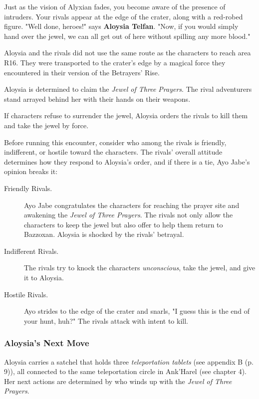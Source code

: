 \documentclass[letterpaper, 11pt, bg=full, twocolumn]{dndbook}
\begin{document}
\begin{DndReadAloud}
Just as the vision of Alyxian fades, you become aware of the presence of intruders. Your rivals appear at the edge of the crater, along with a red-robed figure. "Well done, heroes!" says \textbf{Aloysia Telfan}. "Now, if you would simply hand over the jewel, we can all get out of here without spilling any more blood."
\end{DndReadAloud}

Aloysia and the rivals did not use the same route as the characters to reach area R16. They were transported to the crater's edge by a magical force they encountered in their version of the Betrayers' Rise.

Aloysia is determined to claim the \textit{Jewel of Three Prayers}. The rival adventurers stand arrayed behind her with their hands on their weapons.

If characters refuse to surrender the jewel, Aloysia orders the rivals to kill them and take the jewel by force.

Before running this encounter, consider who among the rivals is friendly, indifferent, or hostile toward the characters. The rivals' overall attitude determines how they respond to Aloysia's order, and if there is a tie, Ayo Jabe's opinion breaks it:

\begin{description}
\item[Friendly Rivals.] Ayo Jabe congratulates the characters for reaching the prayer site and awakening the \textit{Jewel of Three Prayers}. The rivals not only allow the characters to keep the jewel but also offer to help them return to Bazzoxan. Aloysia is shocked by the rivals' betrayal.
\item[Indifferent Rivals.] The rivals try to knock the characters \textit{unconscious}, take the jewel, and give it to Aloysia.
\item[Hostile Rivals.] Ayo strides to the edge of the crater and snarls, "I guess this is the end of your hunt, huh?" The rivals attack with intent to kill.
\end{description}

\subsubsection{Aloysia's Next Move}

Aloysia carries a satchel that holds three \textit{teleportation tablets} (see appendix B (p. 9)), all connected to the same teleportation circle in Ank'Harel (see chapter 4). Her next actions are determined by who winds up with the \textit{Jewel of Three Prayers}.
\end{document}
